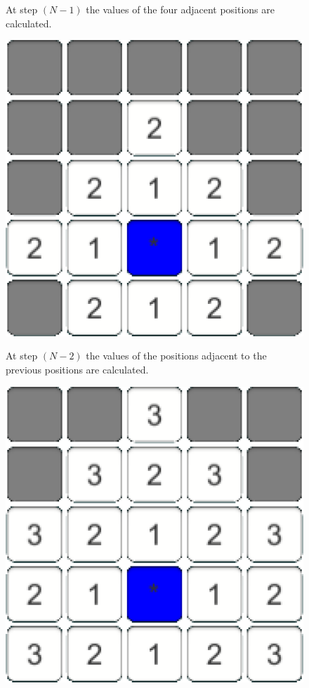 \documentclass[conference]{IEEEtran}
\begin{document}
\begin{figure}[h]
\begin{minipage}[t]{0.3\linewidth}
\caption{At step $(N-1)$ the values of the four adjacent positions are calculated.}
\end{minipage}
\hfill
\begin{minipage}[t]{0.3\linewidth}
\centering
\includegraphics[width=1\textwidth]{images/ValueFunction/03.png}
\caption{At step $(N-2)$ the values of the positions adjacent to the previous positions are calculated.}
\end{minipage}
\caption{ }
\begin{minipage}[t]{0.3\linewidth}
\centering
\includegraphics[width=1\textwidth]{images/ValueFunction/04.png}

\end{minipage}
\end{figure}
\end{document}
